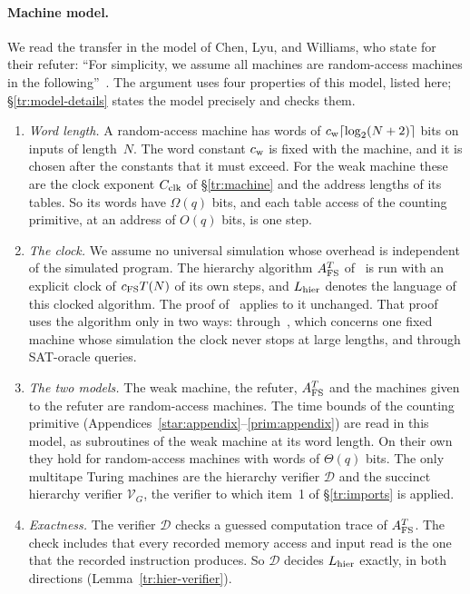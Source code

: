 \documentclass[11pt,letterpaper]{article}
\theoremstyle{definition}
\theoremstyle{remark}
\begin{document}
\paragraph{Machine model.}
We read the transfer in the model of Chen, Lyu, and Williams, who state
for their refuter: ``For simplicity, we assume all machines are
random-access machines in the following''~\cite[Section~4.1]{CLW}. The
argument uses four properties of this model, listed here;
\S\ref{tr:model-details} states the model precisely and checks them.
\begin{enumerate}[label=(\roman*)]
\item \emph{Word length.} A random-access machine has words of
$c_{\rm w}\lceil\log_2(N+2)\rceil$ bits on inputs of length~$N$. The
word constant $c_{\rm w}$ is fixed with the machine, and it is chosen
after the constants that it must exceed. For the weak machine these are
the clock exponent $C_{\rm clk}$ of \S\ref{tr:machine} and the address
lengths of its tables. So its words have $\Omega(q)$ bits, and each
table access of the counting primitive, at an address of $O(q)$ bits,
is one step.

\item \emph{The clock.} We assume no universal simulation whose
overhead is independent of the simulated program. The hierarchy
algorithm $A^T_{\rm FS}$ of~\cite[Definition~4.2]{CLW} is run with an
explicit clock of $c_{\rm FS}T(N)$ of its own steps, and
$L_{\rm hier}$ denotes the language of this clocked algorithm. The
proof of~\cite[Theorem~4.6]{CLW} applies to it unchanged. That proof
uses the algorithm only in two ways: through~\cite[Lemma~4.3]{CLW},
which concerns one fixed machine whose simulation the clock never
stops at large lengths, and through SAT-oracle queries.

\item \emph{The two models.} The weak machine, the refuter,
$A^T_{\rm FS}$ and the machines given to the refuter are random-access
machines. The time bounds of the counting primitive
(Appendices~\ref{star:appendix}--\ref{prim:appendix}) are read in this
model, as subroutines of the weak machine at its word length. On their
own they hold for random-access machines with words of $\Theta(q)$
bits. The only multitape Turing machines are the hierarchy verifier
$\mathcal D$ and the succinct hierarchy verifier $\mathcal V_G$, the
verifier to which item~1 of \S\ref{tr:imports} is applied.

\item \emph{Exactness.} The verifier $\mathcal D$ checks a guessed
computation trace of $A^T_{\rm FS}$. The check includes that every
recorded memory access and input read is the one that the recorded
instruction produces. So $\mathcal D$ decides $L_{\rm hier}$ exactly, in
both directions (Lemma~\ref{tr:hier-verifier}).
\end{enumerate}
\end{document}
